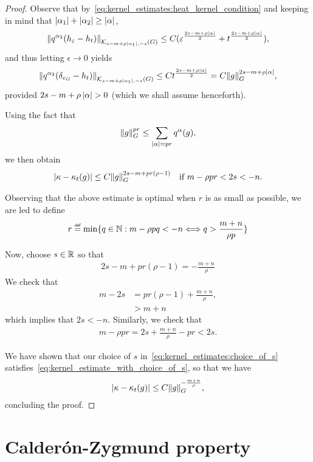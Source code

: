 \begin{proof}
    Observe that by~\eqref{eq:kernel_estimates:heat_kernel_condition}
    and keeping in mind that $\abs {\alpha_1} + \abs {\alpha_2} \geq \abs \alpha$,
    \begin{align*}
        \norm [\KernelsSobolev {s - m + \rho \abs {\alpha_1}} {-s}] {q^{\alpha_2} (h_{\epsilon} - h_t)}
        \leq C (\epsilon^{\frac{2s - m + \rho \abs \alpha} 2} + t^{\frac{2s - m + \rho \abs \alpha} 2}),
    \end{align*}
    and thus letting $\epsilon \to 0$ yields
    \begin{align*}
        \norm [\KernelsSobolev {s - m + \rho \abs {\alpha_1}} {-s}] {q^{\alpha_2} (\delta_{e_\Group} - h_t)}
        \leq C t^{\frac {2s - m + \rho \abs \alpha} 2}
        = C \norm [\Group] g^{2s - m + \rho \abs \alpha},
    \end{align*}
    provided $2s - m + \rho \abs {\alpha} > 0$
    (which we shall assume henceforth).

    Using the fact that
    \begin{align*}
        \norm [\Group] g^{p r}
        \leq \sum_{\abs \alpha = p r} q^\alpha(g),
    \end{align*}
    we then obtain
    \begin{align}
        \abs {\kappa - \kappa_t(g)}
        \leq C \norm [\Group] g^{2s - m + p r(\rho - 1)}
        \quad
        \text{if }
        m - \rho p r < 2s < -n.
        \label{eq:kernel_estimate_with_choice_of_s}
    \end{align}

    Observing that the above estimate is optimal when $r$ is as small as possible,
    we are led to define
    \begin{align*}
        r \defeq \min \{q \in \N : m - \rho p q < -n \Longleftrightarrow q > \frac{m + n} {\rho p}\}
    \end{align*}

    Now, choose $s \in \R$ so that
    \begin{align}
        2s - m + p r (\rho - 1) = - \frac {m + n} \rho
        \label{eq:kernel_estimates:choice_of_s}
    \end{align}
    We check that
    \begin{align*}
        m - 2s &= p r (\rho - 1) + \frac {m + n} \rho,\\
        &> m + n
    \end{align*}
    which implies that $2 s < -n$.
    Similarly,
    we check that
    \begin{align*}
        m - \rho p r = 2s + \frac {m + n} \rho - p r
        < 2 s.
    \end{align*}

    We have shown that our choice of $s$ in~\eqref{eq:kernel_estimates:choice_of_s} satisfies~\eqref{eq:kernel_estimate_with_choice_of_s},
    so that we have
    \begin{align*}
        \abs {\kappa - \kappa_t(g)}
        \leq C \norm [\Group] g^{-\frac{m + n} \rho},
    \end{align*}
    concluding the proof.
\end{proof}

\section{Calder\'on-Zygmund property}
